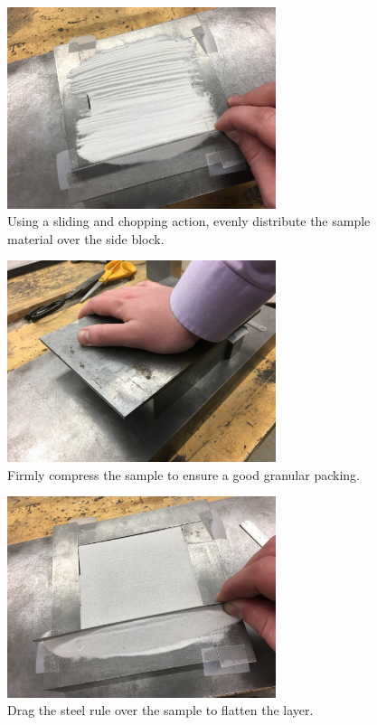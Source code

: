 \begin{figure}
	\centering
        \includegraphics[width=0.7\textwidth]{appendix_sample_prep/dds_cutup_sample.jpg}
   	\caption{Using a sliding and chopping action, evenly distribute the sample material over the side block.}
  	\label{Fig:dds_cutup_sample}
\end{figure}

\begin{figure}
	\centering
        \includegraphics[width=0.7\textwidth]{appendix_sample_prep/dds_press_sample.jpg}
   	\caption{Firmly compress the sample to ensure a good granular packing.}
  	\label{Fig:dds_press_sample}
\end{figure}

\clearpage

\begin{figure}
	\centering
        \includegraphics[width=0.7\textwidth]{appendix_sample_prep/dds_level_sample.jpg}
   	\caption{Drag the steel rule over the sample to flatten the layer.}
  	\label{Fig:dds_level_sample}
\end{figure}

